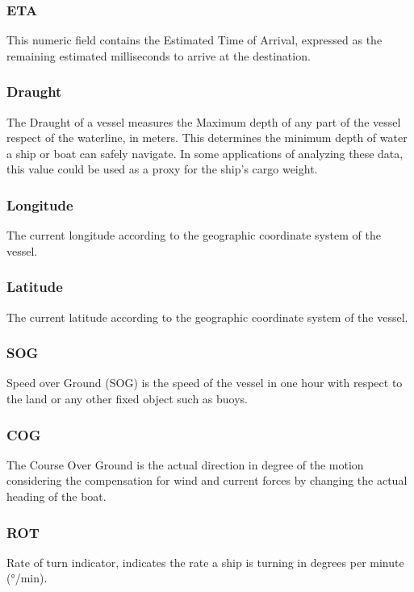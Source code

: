         \subsubsection{ETA}
            This numeric field contains the Estimated Time of Arrival, expressed as the remaining estimated milliseconds to arrive at the destination.
        \subsubsection{Draught}
            The Draught of a vessel measures the Maximum depth of any part of the vessel respect of the waterline, in meters. This determines the minimum depth of water a ship or boat can safely navigate. In some applications of analyzing these data, this value could be used as a proxy for the ship's cargo weight.
        \subsubsection{Longitude}
            The current longitude according to the geographic coordinate system of the vessel.
        \subsubsection{Latitude}
            The current latitude according to the geographic coordinate system of the vessel.
        \subsubsection{SOG}
            Speed over Ground (SOG) is the speed of the vessel in one hour with respect to the land or any other fixed object such as buoys.
        \subsubsection{COG}
            The Course Over Ground is the actual direction in degree of the motion considering the compensation for wind and current forces by changing the actual heading of the boat.
        \subsubsection{ROT}
            Rate of turn indicator, indicates the rate a ship is turning in degrees per minute (°/min).
